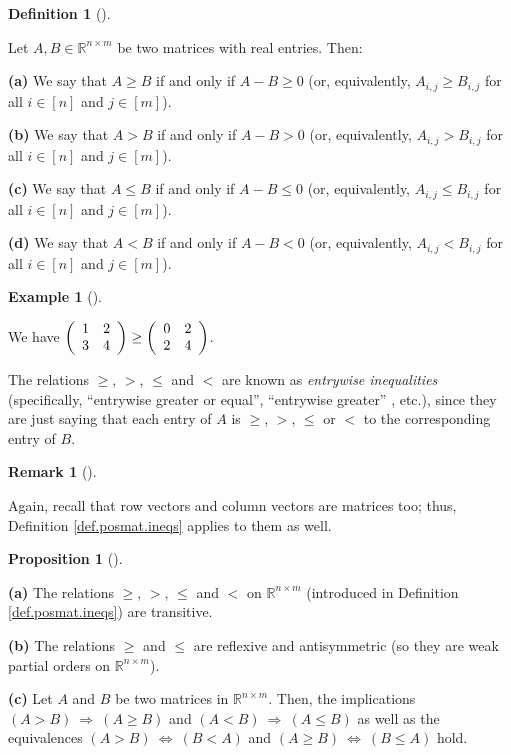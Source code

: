\documentclass[numbers=enddot,12pt,final,onecolumn,notitlepage]{scrartcl}%
\numberwithin{exer}{subsection}
\theoremstyle{definition}
\newtheorem{prop}[theo]{Proposition}
\newenvironment{proposition}[1][]
{\begin{prop}[#1]\begin{leftbar}}
{\end{leftbar}\end{prop}}
\newtheorem{defi}[theo]{Definition}
\newenvironment{definition}[1][]
{\begin{defi}[#1]\begin{leftbar}}
{\end{leftbar}\end{defi}}
\newtheorem{remk}[theo]{Remark}
\newenvironment{remark}[1][]
{\begin{remk}[#1]\begin{leftbar}}
{\end{leftbar}\end{remk}}
\newtheorem{exam}[theo]{Example}
\newenvironment{example}[1][]
{\begin{exam}[#1]\begin{leftbar}}
{\end{leftbar}\end{exam}}
\begin{document}
\begin{definition}
\label{def.posmat.ineqs}Let $A,B\in\mathbb{R}^{n\times m}$ be two matrices
with real entries. Then: \medskip

\textbf{(a)} We say that $A\geq B$ if and only if $A-B\geq0$ (or,
equivalently, $A_{i,j}\geq B_{i,j}$ for all $i\in\left[  n\right]  $ and
$j\in\left[  m\right]  $). \medskip

\textbf{(b)} We say that $A>B$ if and only if $A-B>0$ (or, equivalently,
$A_{i,j}>B_{i,j}$ for all $i\in\left[  n\right]  $ and $j\in\left[  m\right]
$). \medskip

\textbf{(c)} We say that $A\leq B$ if and only if $A-B\leq0$ (or,
equivalently, $A_{i,j}\leq B_{i,j}$ for all $i\in\left[  n\right]  $ and
$j\in\left[  m\right]  $). \medskip

\textbf{(d)} We say that $A<B$ if and only if $A-B<0$ (or, equivalently,
$A_{i,j}<B_{i,j}$ for all $i\in\left[  n\right]  $ and $j\in\left[  m\right]
$).
\end{definition}

\begin{example}
We have $\left(
\begin{array}
[c]{cc}%
1 & 2\\
3 & 4
\end{array}
\right)  \geq\left(
\begin{array}
[c]{cc}%
0 & 2\\
2 & 4
\end{array}
\right)  $.
\end{example}

The relations $\geq$, $>$, $\leq$ and $<$ are known as \emph{entrywise
inequalities} (specifically, \textquotedblleft entrywise greater or
equal\textquotedblright, \textquotedblleft entrywise greater\textquotedblright%
, etc.), since they are just saying that each entry of $A$ is $\geq$, $>$,
$\leq$ or $<$ to the corresponding entry of $B$.

\begin{remark}
Again, recall that row vectors and column vectors are matrices too; thus,
Definition \ref{def.posmat.ineqs} applies to them as well.
\end{remark}

\begin{proposition}
\textbf{(a)} The relations $\geq$, $>$, $\leq$ and $<$ on $\mathbb{R}^{n\times
m}$ (introduced in Definition \ref{def.posmat.ineqs}) are transitive. \medskip

\textbf{(b)} The relations $\geq$ and $\leq$ are reflexive and antisymmetric
(so they are weak partial orders on $\mathbb{R}^{n\times m}$). \medskip

\textbf{(c)} Let $A$ and $B$ be two matrices in $\mathbb{R}^{n\times m}$.
Then, the implications $\left(  A>B\right)  \ \Longrightarrow\ \left(  A\geq
B\right)  $ and $\left(  A<B\right)  \ \Longrightarrow\ \left(  A\leq
B\right)  $ as well as the equivalences $\left(  A>B\right)
\ \Longleftrightarrow\ \left(  B<A\right)  $ and $\left(  A\geq B\right)
\ \Longleftrightarrow\ \left(  B\leq A\right)  $ hold.
\end{proposition}
\end{document}
